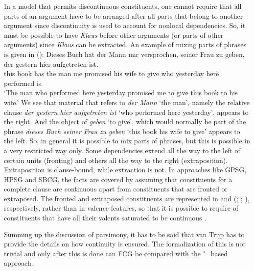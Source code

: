 In a model that permits discontinuous constituents, one cannot require that all parts of an argument have
to be arranged after all parts that belong to another argument since discontinuity is used to
account for nonlocal dependencies. So, it must be possible to have \emph{Klaus} before other
arguments (or parts of other arguments) since \emph{Klaus} can be extracted. An example of mixing
parts of phrases is given in ():
\ea
\gll Dieses Buch hat der Mann mir versprochen, seiner Frau zu geben, der gestern hier aufgetreten ist.\\
     this   book has the man  me  promised     his    wife to give   who yesterday here performed is\\
\glt `The man who performed here yesterday promised me to give this book to his wife.'
\z 
We see that material that refers to \emph{der Mann} `the man', namely the relative clause \emph{der gestern
  hier aufgetreten ist} `who performed here yesterday', appears to the right. And the object of
\emph{geben} `to give', which would normally
be part of the phrase \emph{dieses Buch seiner Frau zu geben} `this book his wife to give' appears to the left. So, in general it
is possible to mix parts of phrases, but this is possible in a very restricted way only. Some
dependencies extend all the way to the left of certain units (fronting) and others all the way to the right
(extraposition). Extraposition is clause-bound, while extraction is not. In approaches like GPSG,
HPSG and SBCG, the facts are covered by assuming that constituents for a complete clause are
continuous apart from constituents that are fronted or extraposed. The fronted and extraposed
constituents are represented in \slasch and \extra (\citealp{Keller95b};
\citealp[Section~13.2]{Mueller99a}; \citealp{Crysmann2013a}), respectively, rather than in valence features,
so that it is possible to require of constituents that have all their valents saturated to be
continuous \citep[]{Mueller99g}.

Summing up the discussion of parsimony, it has to be said that van Trijp has to provide the details
on how continuity is ensured. The formalization of this is not trivial and only after this is done
can FCG be compared with the \slasch"=based approach.

